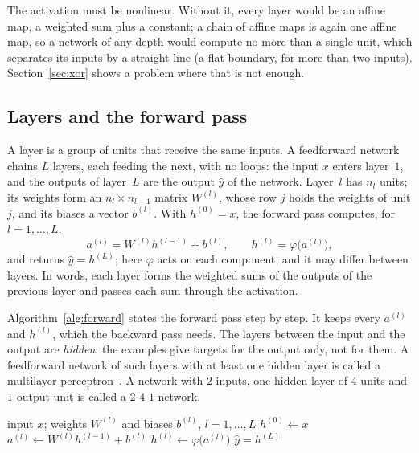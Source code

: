 \documentclass[11pt,a4paper]{amsart}
\numberwithin{equation}{section}
\theoremstyle{plain}
\theoremstyle{definition}
\theoremstyle{remark}
\begin{document}
The activation must be nonlinear. Without it, every layer would be an
affine map, a weighted sum plus a constant; a chain of affine maps is
again one affine map, so a network of any depth would compute no more
than a single unit, which separates its inputs by a straight line (a
flat boundary, for more than two inputs). Section~\ref{sec:xor} shows a
problem where that is not enough.

\subsection{Layers and the forward pass}\label{sec:forward}

A layer is a group of units that receive the same inputs. A feedforward
network chains $L$ layers, each feeding the next, with no loops: the
input $x$ enters layer~$1$, and the outputs of layer~$L$ are the output
$\hat y$ of the network. Layer~$l$ has $n_l$ units; its weights form an
$n_l \times n_{l-1}$ matrix $W^{(l)}$, whose row $j$ holds the weights of
unit $j$, and its biases a vector $b^{(l)}$. With $h^{(0)} = x$, the
forward pass computes, for $l = 1, \dots, L$,
\begin{equation}\label{eq:forward}
  a^{(l)} = W^{(l)} h^{(l-1)} + b^{(l)}, \qquad
  h^{(l)} = \varphi\bigl(a^{(l)}\bigr),
\end{equation}
and returns $\hat y = h^{(L)}$; here $\varphi$ acts on each component,
and it may differ between layers. In words, each layer forms the
weighted sums of the outputs of the previous layer and passes each sum
through the activation.

Algorithm~\ref{alg:forward} states the forward pass step by step. It
keeps every $a^{(l)}$ and $h^{(l)}$, which the backward pass needs. The
layers between the input and the output are \emph{hidden}: the examples
give targets for the output only, not for them. A feedforward network of
such layers with at least one hidden layer is called a multilayer
perceptron~\cite{haykin1998}. A network with $2$ inputs, one hidden
layer of $4$ units and $1$ output unit is called a $2$-$4$-$1$ network.

\begin{algorithm}[b]
\caption{The forward pass}\label{alg:forward}
\small
\begin{algorithmic}[1]
\Require input $x$; weights $W^{(l)}$ and biases $b^{(l)}$,
  $l = 1, \dots, L$
\State $h^{(0)} \gets x$
  \State $a^{(l)} \gets W^{(l)} h^{(l-1)} + b^{(l)}$
  \State $h^{(l)} \gets \varphi\bigl(a^{(l)}\bigr)$
\EndFor
\State \Return $\hat y = h^{(L)}$
\end{algorithmic}
\end{algorithm}
\end{document}
